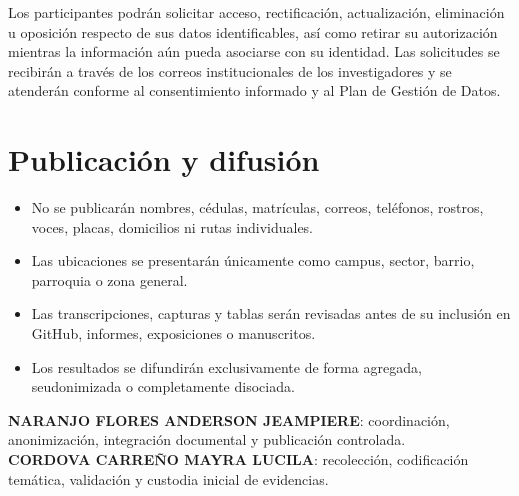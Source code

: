 \documentclass[10pt,a4paper]{article}
\begin{document}
Los participantes podrán solicitar acceso, rectificación, actualización, eliminación u oposición respecto de sus datos identificables, así como retirar su autorización mientras la información aún pueda asociarse con su identidad. Las solicitudes se recibirán a través de los correos institucionales de los investigadores y se atenderán conforme al consentimiento informado y al Plan de Gestión de Datos.

\section{Publicación y difusión}

\begin{itemize}
  \item No se publicarán nombres, cédulas, matrículas, correos, teléfonos, rostros, voces, placas, domicilios ni rutas individuales.
  \item Las ubicaciones se presentarán únicamente como campus, sector, barrio, parroquia o zona general.
  \item Las transcripciones, capturas y tablas serán revisadas antes de su inclusión en GitHub, informes, exposiciones o manuscritos.
  \item Los resultados se difundirán exclusivamente de forma agregada, seudonimizada o completamente disociada.
\end{itemize}

\begin{InfoBox}
\textbf{NARANJO FLORES ANDERSON JEAMPIERE}: coordinación, anonimización, integración documental y publicación controlada.\\
\textbf{CORDOVA CARREÑO MAYRA LUCILA}: recolección, codificación temática, validación y custodia inicial de evidencias.
\end{InfoBox}
\end{document}
